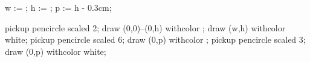     w := \overlaywidth;
    h := \overlayheight;
    p := h - 0.3cm;

    pickup pencircle scaled 2;
    draw (0,0)--(0,h) withcolor ;
    draw (w,h) withcolor white;
    pickup pencircle scaled 6;
    draw (0,p) withcolor ;
    pickup pencircle scaled 3;
    draw (0,p) withcolor white;
\stopuseMPgraphic